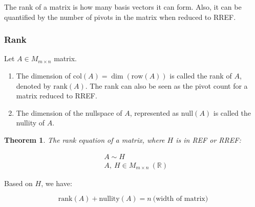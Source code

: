 \documentclass[12pt]{article}
\theoremstyle{plain}
\newtheorem{theorem}{Theorem}[section]
\theoremstyle{remark}
\theoremstyle{definition}
\begin{document}
The rank of a matrix is how many basis vectors it can form. Also, it can
be quantified by the number of pivots in the matrix when reduced to
RREF.


\subsubsection{Rank}

Let \(A \in M_{m \times n}\) matrix.

\begin{enumerate}
\def\labelenumi{\arabic{enumi}.}
\item
  The dimension of \(\text{col}(A) = \dim\left( \text{row}(A) \right)\)
  is called the rank of \(A\), denoted by \(\text{rank}(A)\). The rank
  can also be seen as the pivot count for a matrix reduced to RREF.
\item
  The dimension of the nullspace of \(A\), represented as
  \(\text{null}(A)\) is called the nullity of \(A\).
\end{enumerate}

\begin{theorem}
The rank equation of a matrix, where \(H\) is in REF
or RREF:

\begin{align*}
&A\sim H \\
&A,\ H \in M_{m \times n}\ \left( \mathbb{R} \right)
\end{align*}

\end{theorem}

Based on \(H\), we have:

\[\text{rank}(A) + \text{nullity}(A) = n\ \text{(width\ of\ matrix)}\]
\end{document}
